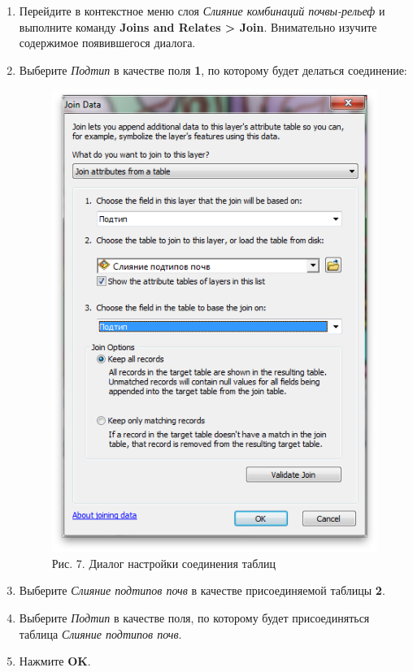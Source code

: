 \documentclass[12pt,]{book}
\begin{document}
\begin{enumerate}
\def\labelenumi{\arabic{enumi}.}
\item
  Перейдите в контекстное меню слоя \emph{Слияние комбинаций почвы-рельеф} и выполните команду \textbf{Joins and Relates \textgreater{} Join}. Внимательно изучите содержимое появившегося диалога.
\item
  Выберите \emph{Подтип} в качестве поля \textbf{1}, по которому будет делаться соединение:

  \begin{figure}
  \centering
  \includegraphics{images/Ex10/image12.png}
  \caption{Рис. 7. Диалог настройки соединения таблиц}
  \end{figure}
\item
  Выберите \emph{Слияние подтипов почв} в качестве присоединяемой таблицы \textbf{2}.
\item
  Выберите \emph{Подтип} в качестве поля, по которому будет присоединяться таблица \emph{Слияние подтипов почв}.
\item
  Нажмите \textbf{OK}.
\end{enumerate}
\end{document}
